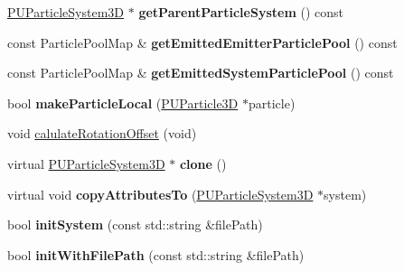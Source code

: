 \begin{DoxyCompactItemize}
\item 
\mbox{\label{classPUParticleSystem3D_a4171daecac61ea4099dc922f6b7a50d6}} 
\hyperlink{classPUParticleSystem3D}{P\+U\+Particle\+System3D} $\ast$ {\bfseries get\+Parent\+Particle\+System} () const
\item 
\mbox{\label{classPUParticleSystem3D_aa5caea161afed8e637b3441cc62f5d5b}} 
const Particle\+Pool\+Map \& {\bfseries get\+Emitted\+Emitter\+Particle\+Pool} () const
\item 
\mbox{\label{classPUParticleSystem3D_a448a09e71f98bbfce4d9b31d309fade7}} 
const Particle\+Pool\+Map \& {\bfseries get\+Emitted\+System\+Particle\+Pool} () const
\item 
\mbox{\label{classPUParticleSystem3D_ac23bb10ddaae44d47269da25cc0c8411}} 
bool {\bfseries make\+Particle\+Local} (\hyperlink{structPUParticle3D}{P\+U\+Particle3D} $\ast$particle)
\item 
void \hyperlink{classPUParticleSystem3D_a399e6e4c5e54c5ec87cb1d38f7d254af}{calulate\+Rotation\+Offset} (void)
\item 
\mbox{\label{classPUParticleSystem3D_a46c00bdf92fe5e94994cecc13ae45769}} 
virtual \hyperlink{classPUParticleSystem3D}{P\+U\+Particle\+System3D} $\ast$ {\bfseries clone} ()
\item 
\mbox{\label{classPUParticleSystem3D_a230b6f70785ba09b9eed921e5402ddaa}} 
virtual void {\bfseries copy\+Attributes\+To} (\hyperlink{classPUParticleSystem3D}{P\+U\+Particle\+System3D} $\ast$system)
\item 
\mbox{\label{classPUParticleSystem3D_acdd48ac0ca39bf0a32f4eb8d3ee91813}} 
bool {\bfseries init\+System} (const std\+::string \&file\+Path)
\item 
\mbox{\label{classPUParticleSystem3D_a75bd51ae2fae4109e3211b82e5dfabb0}} 
bool {\bfseries init\+With\+File\+Path} (const std\+::string \&file\+Path)
\item 
\mbox{\label{classPUParticleSystem3D_a258ffd9a1253de6d18a52a0e6bf63191}} 

\end{DoxyCompactItemize}
